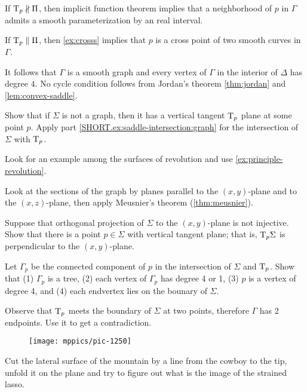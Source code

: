 If $\mathrm{T}_p\nparallel\Pi$, then implicit function theorem implies that a neighborhood of $p$ in $\Gamma$ admits a smooth parameterization by an real interval.

If  $\mathrm{T}_p\parallel\Pi$, then \ref{ex:crosss} implies that $p$ is a cross point of two smooth curves in $\Gamma$.

It follows that $\Gamma$ is a smooth graph and every vertex of $\Gamma$ in the interior of $\Delta$ has degree $4$.
No cycle condition follows from Jordan's theorem \ref{thm:jordan} and \ref{lem:convex-saddle}.

 Show that if $\Sigma$ is not a graph, then it has a vertical tangent $\mathrm{T}_p$ plane at some point $p$.
Apply part \ref{SHORT.ex:saddle-intersection:graph} for the intersection of $\Sigma$ with $\mathrm{T}_p$.

 Look for an example among the surfaces of revolution and use \ref{ex:principle-revolution}.

 Look at the sections of the graph by planes parallel to the $(x,y)$-plane and to the $(x,z)$-plane, then apply Meusnier’s theorem (\ref{thm:meusnier}).

Suppose that orthogonal projection of $\Sigma$ to the $(x,y)$-plane is not injective.
Show that there is a point $p\in\Sigma$ with vertical tangent plane;
that is, $\mathrm{T}_p\Sigma$ is perpendicular to the $(x,y)$-plane.

Let $\Gamma_p$ be the connected component of $p$ in the intersection of $\Sigma$ and $\mathrm{T}_p$.
Show that (1) $\Gamma_p$ is a tree, (2) each vertex of $\Gamma_p$ has degree 4 or 1, (3) $p$ is a vertex of degree 4, and (4) each endvertex lies on the bounary of $\Sigma$.

Observe that $\mathrm{T}_p$ meets the boundary of $\Sigma$ at two points,
therefore $\Gamma$ has 2 endpoints.
Use it to get a contradiction.



\begin{wrapfigure}{r}{24 mm}
\vskip-0mm
\centering
\texttt{[image: mppics/pic-1250]}
\vskip-0mm
\end{wrapfigure}

 Cut the lateral surface of the mountain by a line from the cowboy to the tip, unfold it on the plane and try to figure out what is the image of the strained lasso.



